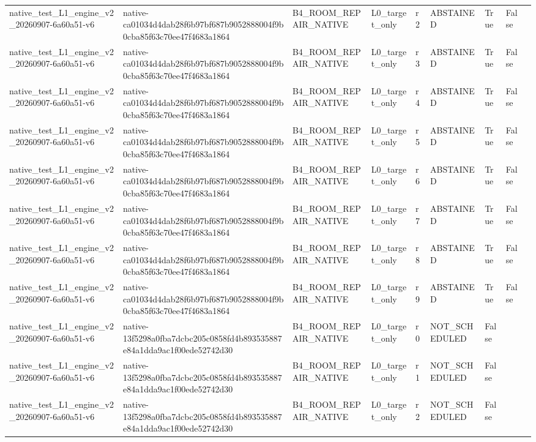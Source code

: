 \begin{tabular}{lllllllll}
native\_test\_L1\_engine\_v2\_20260907-6a60a51-v6 & native-ca01034d4dab28f6b97bf687b9052888004f9b0cba85f63c70ee47f4683a1864 & B4\_ROOM\_REPAIR\_NATIVE & L0\_target\_only & r2 & ABSTAINED & True & False &  \\
native\_test\_L1\_engine\_v2\_20260907-6a60a51-v6 & native-ca01034d4dab28f6b97bf687b9052888004f9b0cba85f63c70ee47f4683a1864 & B4\_ROOM\_REPAIR\_NATIVE & L0\_target\_only & r3 & ABSTAINED & True & False &  \\
native\_test\_L1\_engine\_v2\_20260907-6a60a51-v6 & native-ca01034d4dab28f6b97bf687b9052888004f9b0cba85f63c70ee47f4683a1864 & B4\_ROOM\_REPAIR\_NATIVE & L0\_target\_only & r4 & ABSTAINED & True & False &  \\
native\_test\_L1\_engine\_v2\_20260907-6a60a51-v6 & native-ca01034d4dab28f6b97bf687b9052888004f9b0cba85f63c70ee47f4683a1864 & B4\_ROOM\_REPAIR\_NATIVE & L0\_target\_only & r5 & ABSTAINED & True & False &  \\
native\_test\_L1\_engine\_v2\_20260907-6a60a51-v6 & native-ca01034d4dab28f6b97bf687b9052888004f9b0cba85f63c70ee47f4683a1864 & B4\_ROOM\_REPAIR\_NATIVE & L0\_target\_only & r6 & ABSTAINED & True & False &  \\
native\_test\_L1\_engine\_v2\_20260907-6a60a51-v6 & native-ca01034d4dab28f6b97bf687b9052888004f9b0cba85f63c70ee47f4683a1864 & B4\_ROOM\_REPAIR\_NATIVE & L0\_target\_only & r7 & ABSTAINED & True & False &  \\
native\_test\_L1\_engine\_v2\_20260907-6a60a51-v6 & native-ca01034d4dab28f6b97bf687b9052888004f9b0cba85f63c70ee47f4683a1864 & B4\_ROOM\_REPAIR\_NATIVE & L0\_target\_only & r8 & ABSTAINED & True & False &  \\
native\_test\_L1\_engine\_v2\_20260907-6a60a51-v6 & native-ca01034d4dab28f6b97bf687b9052888004f9b0cba85f63c70ee47f4683a1864 & B4\_ROOM\_REPAIR\_NATIVE & L0\_target\_only & r9 & ABSTAINED & True & False &  \\
native\_test\_L1\_engine\_v2\_20260907-6a60a51-v6 & native-13f5298a0fba7dcbc205c0858fd4b893535887e84a1dda9ac1f00ede52742d30 & B4\_ROOM\_REPAIR\_NATIVE & L0\_target\_only & r0 & NOT\_SCHEDULED & False &  &  \\
native\_test\_L1\_engine\_v2\_20260907-6a60a51-v6 & native-13f5298a0fba7dcbc205c0858fd4b893535887e84a1dda9ac1f00ede52742d30 & B4\_ROOM\_REPAIR\_NATIVE & L0\_target\_only & r1 & NOT\_SCHEDULED & False &  &  \\
native\_test\_L1\_engine\_v2\_20260907-6a60a51-v6 & native-13f5298a0fba7dcbc205c0858fd4b893535887e84a1dda9ac1f00ede52742d30 & B4\_ROOM\_REPAIR\_NATIVE & L0\_target\_only & r2 & NOT\_SCHEDULED & False &  &  \\

\end{tabular}
